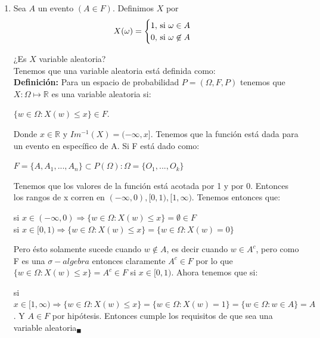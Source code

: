\documentclass[12pt,a4paper]{report}
\begin{document}
	\begin{enumerate}
  
		\item {
			Sea $A$ un evento $(A \in F)$. Definimos $X$ por
			\[
				X(\omega) =
				\begin{cases}
					1, $ si $\omega \in A\\
					0, $ si $\omega \not\in A
				\end{cases}
			\]
      
			¿Es $X$ variable aleatoria?\\
			
			Tenemos que una variable aleatoria está definida como: \\
			\textbf{Definición:} Para un espacio de probabilidad $P=(\Omega,F,P)$ tenemos que $X:\Omega \mapsto \mathds{R}$ es una variable aleatoria si:
        		   	\begin{center}
			   $ \lbrace w\in \Omega : X(w) \leq x \rbrace \in F.$
			\end{center}
			Donde $x\in \mathds{R}$ y $Im^{-1}(X)=(-\infty,x]$. Tenemos que la función está dada para un evento en específico de A. Si F está dado como: \\
			\begin{center}
			    $F= \lbrace A, A_{1},...,A_{n} \rbrace \subset P(\Omega): \Omega = \lbrace O_{1},...,O_{k} \rbrace $
			\end{center}
			Tenemos que los valores de la función está acotada por 1 y por 0. Entonces los rangos de x corren en $(-\infty,0),[0,1),[1,\infty)$. Tenemos entonces que:\\
		    \begin{center}
		        si $x\in (-\infty,0) \Rightarrow \lbrace w \in \Omega: X(w) \leq x \rbrace =  \emptyset  \in F $\\
		        si $x\in [0,1)  \Rightarrow \lbrace w \in \Omega: X(w) \leq x \rbrace = \lbrace w\in \Omega : X(w)=0 \rbrace$
		    \end{center}
		    Pero ésto solamente sucede cuando $w\notin A $, es decir cuando $w \in A^c$, pero como F es una $\sigma-algebra$ entonces claramente $A^c\in F$ por lo que $\lbrace w \in \Omega : X(w) \leq x \rbrace = A^c \in F$ si $x\in [0,1)$.  Ahora tenemos que si:\\
		    \begin{center}
		        si $x\in [1,\infty) \Rightarrow \lbrace w \in \Omega : X(w) \leq x \rbrace = \lbrace w \in \Omega : X(w)=1 \rbrace  = \lbrace w\in \Omega: w \in A \rbrace = A$. 
		        Y $A \in F$ por hipótesis. Entonces cumple los requisitos de que sea una variable aleatoria$_{\blacksquare}$
		    \end{center}
					
}
\end{enumerate}
\end{document}
